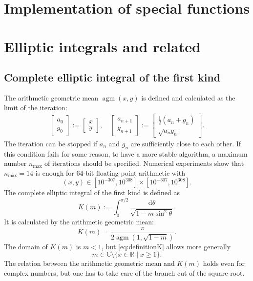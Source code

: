 \documentclass[a4paper,10pt,fleqn]{scrartcl}
\newcommand{\R}{\mathbb R}
\newcommand{\C}{\mathbb C}
\begin{document}
\thispagestyle{empty}

\section*{Implementation of special functions}

\tableofcontents

\section{Elliptic integrals and related}
\subsection{Complete elliptic integral of the first kind}
The arithmetic geometric mean $\operatorname{agm}(x,y)$
is defined and calculated as the limit of the iteration:
\begin{align}
\begin{bmatrix}
a_0\\
g_0
\end{bmatrix}
:=
\begin{bmatrix}
x\\
y
\end{bmatrix},
\quad
\begin{bmatrix}
a_{n+1}\\
g_{n+1}
\end{bmatrix}
:=
\begin{bmatrix}
\tfrac{1}{2}(a_n+g_n)\\
\sqrt{a_n g_n}
\end{bmatrix}.
\end{align}
The iteration can be stopped if $a_n$ and $g_n$ are sufficiently
close to each other. If this condition fails for some reason,
to have a more stable algorithm, a maximum number $n_{\mathrm{max}}$ of iterations
should be specified. Numerical experiments show that $n_{\mathrm{max}}=14$
is enough for 64-bit floating point arithmetic with
\begin{equation}
(x,y)\in [10^{-307},10^{308}]\times [10^{-307},10^{308}].
\end{equation}
The complete elliptic integral of the first kind is defined as
\begin{equation}\label{eq:definitionK}
K(m) := \int_0^{\pi/2} \frac{\mathrm d\theta}{\sqrt{1-m\sin^2\theta}}.
\end{equation}
It is calculated by the arithmetic
geometric mean:
\begin{equation}
K(m) = \frac{\pi}{2\operatorname{agm}(1,\sqrt{1-m})}.
\end{equation}
The domain of $K(m)$ is $m<1$, but \eqref{eq:definitionK} allows more generally
\begin{equation}
m\in\C\setminus\{x\in\R\mid x\ge 1\}.
\end{equation}
The relation between the arithmetic geometric mean and $K(m)$ holds
even for complex numbers, but one has to take care of the branch
cut of the square root.
\end{document}
